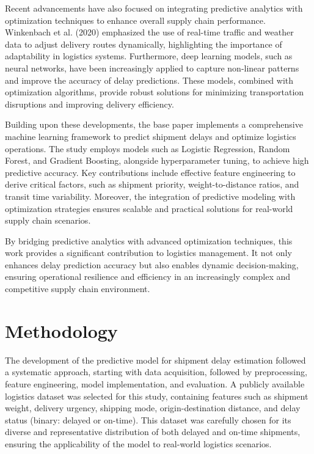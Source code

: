 \documentclass[conference]{IEEEtran}
\begin{document}
Recent advancements have also focused on integrating predictive analytics with optimization techniques to enhance overall supply chain performance. Winkenbach et al. (2020) emphasized the use of real-time traffic and weather data to adjust delivery routes dynamically, highlighting the importance of adaptability in logistics systems. Furthermore, deep learning models, such as neural networks, have been increasingly applied to capture non-linear patterns and improve the accuracy of delay predictions. These models, combined with optimization algorithms, provide robust solutions for minimizing transportation disruptions and improving delivery efficiency.

Building upon these developments, the base paper implements a comprehensive machine learning framework to predict shipment delays and optimize logistics operations. The study employs models such as Logistic Regression, Random Forest, and Gradient Boosting, alongside hyperparameter tuning, to achieve high predictive accuracy. Key contributions include effective feature engineering to derive critical factors, such as shipment priority, weight-to-distance ratios, and transit time variability. Moreover, the integration of predictive modeling with optimization strategies ensures scalable and practical solutions for real-world supply chain scenarios.

By bridging predictive analytics with advanced optimization techniques, this work provides a significant contribution to logistics management. It not only enhances delay prediction accuracy but also enables dynamic decision-making, ensuring operational resilience and efficiency in an increasingly complex and competitive supply chain environment.



\section{Methodology}

The development of the predictive model for shipment delay estimation followed a systematic approach, starting with data acquisition, followed by preprocessing, feature engineering, model implementation, and evaluation. A publicly available logistics dataset was selected for this study, containing features such as shipment weight, delivery urgency, shipping mode, origin-destination distance, and delay status (binary: delayed or on-time). This dataset was carefully chosen for its diverse and representative distribution of both delayed and on-time shipments, ensuring the applicability of the model to real-world logistics scenarios.
\end{document}
